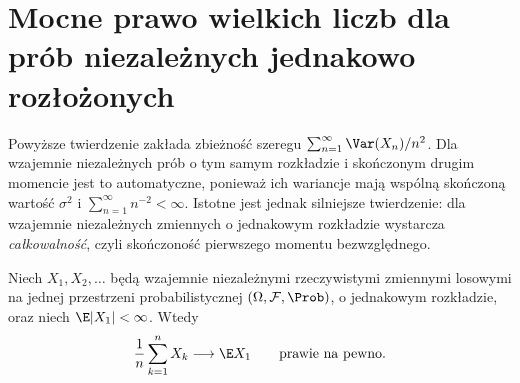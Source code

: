 \section{Mocne prawo wielkich liczb dla prób niezależnych jednakowo rozłożonych}

Powyższe twierdzenie zakłada zbieżność szeregu
$\sum_{n=1}^\infty\Var(X_n)/n^2$. Dla wzajemnie
niezależnych prób o tym samym rozkładzie i skończonym
drugim momencie jest to automatyczne, ponieważ ich
wariancje mają wspólną skończoną wartość $\sigma^2$
i $\sum_{n=1}^\infty n^{-2}<\infty$.
Istotne jest jednak silniejsze twierdzenie: dla
wzajemnie niezależnych zmiennych o jednakowym rozkładzie
wystarcza \emph{całkowalność}, czyli skończoność
pierwszego momentu bezwzględnego.

\begin{twierdzenie}
Niech $X_1,X_2,\ldots$ będą wzajemnie niezależnymi
rzeczywistymi zmiennymi losowymi na jednej przestrzeni
probabilistycznej $(\Omega,\mathcal F,\Prob)$,
o jednakowym rozkładzie, oraz niech $\E|X_1|<\infty$.
Wtedy
\[
\frac1n\sum_{k=1}^n X_k\longrightarrow\E X_1
\qquad\text{prawie na pewno}.
\]
\end{twierdzenie}
